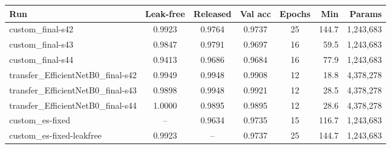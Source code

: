 \begin{tabular}{lccccrr}
\toprule
Run & Leak-free & Released & Val acc & Epochs & Min & Params \\
\midrule
custom\_final-s42 & 0.9923 & 0.9764 & 0.9737 & 25 & 144.7 & 1,243,683\\
custom\_final-s43 & 0.9847 & 0.9791 & 0.9697 & 16 & 59.5 & 1,243,683\\
custom\_final-s44 & 0.9413 & 0.9686 & 0.9684 & 16 & 77.9 & 1,243,683\\
transfer\_EfficientNetB0\_final-s42 & 0.9949 & 0.9948 & 0.9908 & 12 & 18.8 & 4,378,278\\
transfer\_EfficientNetB0\_final-s43 & 0.9898 & 0.9948 & 0.9921 & 12 & 28.5 & 4,378,278\\
transfer\_EfficientNetB0\_final-s44 & 1.0000 & 0.9895 & 0.9895 & 12 & 28.6 & 4,378,278\\
custom\_es-fixed & -- & 0.9634 & 0.9735 & 15 & 116.7 & 1,243,683\\
custom\_es-fixed-leakfree & 0.9923 & -- & 0.9737 & 25 & 144.7 & 1,243,683 \\
\bottomrule
\end{tabular}
